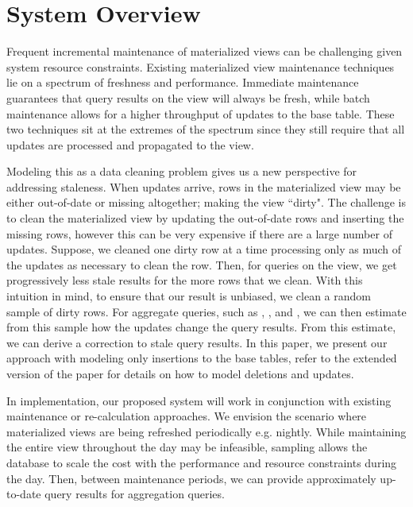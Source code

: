 \section{System Overview}\label{sec-arch}
Frequent incremental maintenance of materialized views can be challenging given system resource constraints.
Existing materialized view maintenance techniques lie on a spectrum of freshness and performance.
Immediate maintenance guarantees that query results on the view will always be fresh, while batch maintenance allows for a higher throughput of updates to the base table.
These two techniques sit at the extremes of the spectrum since they still require that all updates are processed and propagated to the view.

Modeling this as a data cleaning problem gives us a new perspective for addressing staleness.
When updates arrive, rows in the materialized view may be either out-of-date or missing altogether; making the view ``dirty".
The challenge is to clean the materialized view by updating the out-of-date rows and inserting the missing rows, however this can be very expensive if there are a large number of updates.
Suppose, we cleaned one dirty row at a time processing only as much of the updates as necessary to clean the row.
Then, for queries on the view, we get progressively less stale results for the more rows that we clean.
With this intuition in mind, to ensure that our result is unbiased, we clean a random sample of dirty rows.
For aggregate queries, such as \sumfunc, \countfunc, and \avgfunc, we can then estimate from this sample how the updates change the query results.
From this estimate, we can derive a correction to stale query results.
In this paper, we present our approach with modeling only insertions to the base tables, refer to the extended version of the paper  for details on how to model deletions and updates.


In implementation, our proposed system will work in conjunction with existing maintenance or re-calculation approaches.
We envision the scenario where materialized views are being refreshed periodically e.g. nightly.
While maintaining the entire view throughout the day may be infeasible, sampling allows the database to scale the cost with the performance and resource constraints during the day.
Then, between maintenance periods, we can provide approximately up-to-date query results for aggregation queries.

